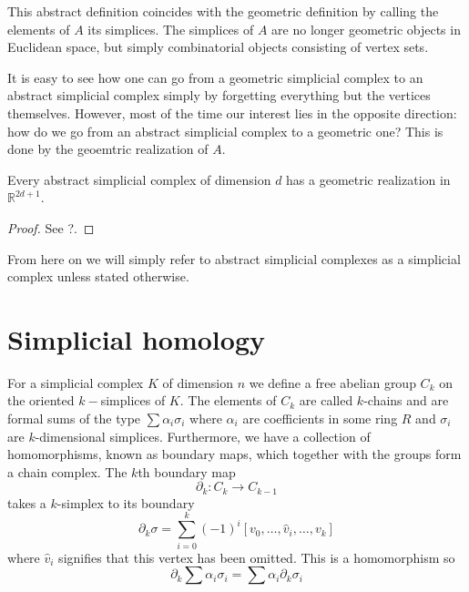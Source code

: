 This abstract definition coincides with the geometric definition by calling the elements of $A$ its simplices. The simplices of $A$ are no longer geometric objects in Euclidean space, but simply combinatorial objects consisting of vertex sets.

It is easy to see how one can go from a geometric simplicial complex to an abstract simplicial complex simply by forgetting everything but the vertices themselves. However, most of the time our interest lies in the opposite direction: how do we go from an abstract simplicial complex to a geometric one? This is done by the geoemtric realization of $A$.

\begin{theorem}
Every abstract simplicial complex of dimension $d$ has a geometric realization in $\mathbb{R}^{2d+1}$.
\end{theorem}
\begin{proof}
See ?.
\end{proof}%
From here on we will simply refer to abstract simplicial complexes as a simplicial complex unless stated otherwise.
\section{Simplicial homology}
For a simplicial complex $K$ of dimension $n$ we define a free abelian group $C_{k}$ on the oriented $k-$simplices of $K$.
The elements of $C_{k}$ are called $k$-chains and are formal sums of the type
$\sum \alpha_{i} \sigma_{i}$
where $\alpha_{i}$ are coefficients in some ring $R$ and $\sigma_{i}$ are $k$-dimensional simplices. Furthermore, we have a collection of homomorphisms, known as boundary maps, which together with the groups form a chain complex. The $k$th boundary map
\[ \partial_{k}: C_{k} \to C_{k-1}\]
takes a $k$-simplex to its boundary
\[ \partial_{k} \sigma = \sum^{k}_{{i=0}} (-1)^{i} [v_{0},\dots,\hat v_{i}, \dots, v_{k}]\]
where $\hat v_{i}$ signifies that this vertex has been omitted. This is a homomorphism so
\[\partial_{k} \sum \alpha_{i}\sigma_{i} = \sum \alpha_{i} \partial_{k} \sigma_{i}\]

